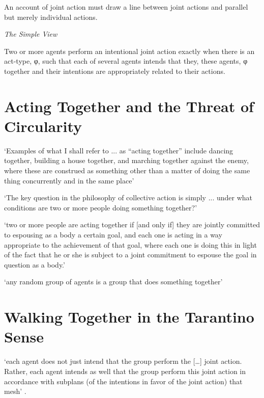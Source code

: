 \documentclass[12pt]{extarticle}
\begin{document}
\begin{multicols*}{3}
              
An account of joint action must draw a line between joint actions and parallel but 
merely individual actions.
              

 
\emph{The Simple View}
 
Two or more agents perform an intentional joint action exactly when there is an act-type, φ, such that each of several agents intends that they, these agents, φ  together and their intentions are  appropriately related  to their actions.

 
 
 
\section{Acting Together and the Threat of Circularity}
 
‘Examples of what I shall refer to ... as “acting together” include dancing together, building a house together, and marching together against the enemy, where these are construed as something other than a matter of doing the same thing concurrently and in the same place’ 
\citep[p.~23]{gilbert:2014_book}
 
‘The key question in the philosophy of collective action is simply ... under what conditions are two or more people doing something together?’
\citep[p.\ 67]{Gilbert:2010fk}
 
‘two or more people are acting together if [and only if] they are jointly committed  to espousing as a body a certain goal, and each one is acting in a way appropriate to the achievement of that goal, where each one is doing this in light of the fact that he or she is subject to a joint commitment to espouse the goal in question as a body.’
\citep[p.~34]{gilbert:2014_book}
 
‘any random group of agents is a group that does something together’
\citep[p.~128]{ludwig:2014_ontology}
 
 
 
\section{Walking Together in the Tarantino Sense}
 
`each agent does not just intend that the group perform the […] joint action. Rather, each agent intends as well that the group perform this joint action in accordance with subplans (of the intentions in favor of the joint action) that mesh' \citep[p.\ 332]{Bratman:1992mi}.
 

\end{multicols*}
\end{document}
